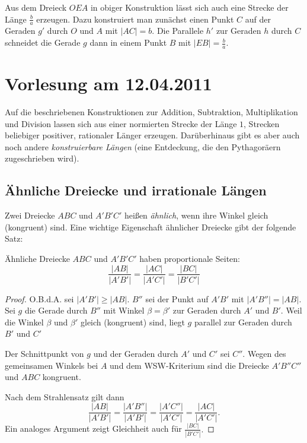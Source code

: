 Aus dem Dreieck $OEA$ in obiger Konstruktion lässt sich auch eine Strecke der Länge $\frac{b}{a}$
erzeugen. Dazu konstruiert man zunächst einen Punkt $C$ auf der Geraden $g'$ durch $O$ und $A$ mit
$|AC|=b$. Die Parallele $h'$ zur Geraden $h$ durch $C$ schneidet die Gerade $g$ dann in einem Punkt
$B$ mit $|EB|=\frac{b}{a}$.

\section*{Vorlesung am 12.04.2011}

Auf die beschriebenen Konstruktionen zur Addition, Subtraktion, Multiplikation und Division lassen
sich aus einer normierten Strecke der Länge $1$, Strecken beliebiger positiver, rationaler Länger
erzeugen. Darüberhinaus gibt es aber auch noch andere {\em konstruierbare Längen} (eine Entdeckung,
die den Pythagoräern zugeschrieben wird).

\subsection*{Ähnliche Dreiecke und irrationale Längen}

Zwei Dreiecke $ABC$ und $A'B'C'$ heißen {\em ähnlich}, wenn ihre Winkel gleich (kongruent) sind.
Eine wichtige Eigenschaft ähnlicher Dreiecke gibt der folgende Satz:

\begin{thm}
    Ähnliche Dreiecke $ABC$ und $A'B'C'$ haben proportionale Seiten:
    $$
    \frac{|AB|}{|A'B'|} = \frac{|AC|}{|A'C'|} = \frac{|BC|}{|B'C'|}
    $$
\end{thm}

\begin{proof}
    O.B.d.A. sei $|A'B'| \geq |AB|$. $B''$ sei der Punkt auf $A'B'$ mit $|A'B''| = |AB|$.
    Sei $g$ die Gerade durch $B''$ mit Winkel $\beta = \beta'$ zur Geraden durch $A'$ und $B'$. Weil
    die Winkel $\beta$ und $\beta'$ gleich (kongruent) sind, liegt $g$ parallel zur Geraden durch
    $B'$ und $C'$

    Der Schnittpunkt von $g$ und der Geraden durch $A'$ und $C'$ sei $C''$. Wegen des gemeinsamen
    Winkels bei $A$ und dem WSW-Kriterium sind die Dreiecke $A'B''C''$ und $ABC$ kongruent.

    Nach dem Strahlensatz gilt dann
    $$
    \frac{|AB|}{|A'B'|} = \frac{|A'B''|}{|A'B'|} = \frac{|A'C''|}{|A'C'|} = \frac{|AC|}{|A'C'|} .
    $$
    Ein analoges Argument %
    zeigt Gleichheit auch für
    $\displaystyle \frac{|BC|}{|B'C'|}.$
\end{proof}

